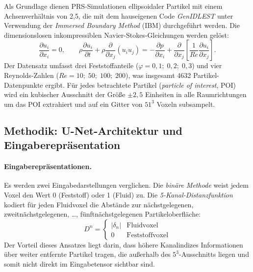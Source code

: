 \documentclass[a4paper,12pt]{article}
\begin{document}
Als Grundlage dienen PRS-Simulationen ellipsoidaler Partikel mit einem
Achsenverhältnis von 2{,}5, die mit dem hauseigenen Code
\textit{GenIDLEST} unter Verwendung der \emph{Immersed Boundary Method} (IBM)
durchgeführt werden. Die dimensionslosen inkompressiblen Navier-Stokes-Gleichungen
werden gelöst:
\begin{equation}
    \frac{\partial u_i}{\partial x_i} = 0, \qquad
    \rho\frac{\partial u_i}{\partial t} + \rho\frac{\partial}{\partial x_j}(u_i u_j)
    = -\frac{\partial p}{\partial x_i}
      + \frac{\partial}{\partial x_j}\!\left[\frac{1}{Re}\frac{\partial u_i}{\partial x_j}\right].
\end{equation}
Der Datensatz umfasst drei Feststoffanteile ($\varphi = 0{,}1;\;0{,}2;\;0{,}3$)
und vier Reynolds-Zahlen ($Re = 10;\;50;\;100;\;200$), was insgesamt
4632 Partikel-Datenpunkte ergibt. Für jedes betrachtete Partikel
(\emph{particle of interest}, POI) wird ein kubischer Ausschnitt der Größe
$\pm2{,}5$ Einheiten in alle Raumrichtungen um das POI extrahiert und auf ein
Gitter von $51^3$ Voxeln subsampelt.

\subsection*{Methodik: U-Net-Architektur und Eingaberepräsentation}

\paragraph{Eingaberepräsentationen.}
Es werden zwei Eingabedarstellungen verglichen. Die \emph{binäre Methode}
weist jedem Voxel den Wert 0 (Feststoff) oder 1 (Fluid) zu. Die
\emph{5-Kanal-Distanzfunktion} kodiert für jeden Fluidvoxel die Abstände zur
nächstgelegenen, zweitnächstgelegenen, \ldots, fünftnächstgelegenen
Partikeloberfläche:
\begin{equation}
    D^n = \begin{cases}
        |\delta_n| & \text{Fluidvoxel} \\
        0          & \text{Feststoffvoxel}
    \end{cases}
\end{equation}
Der Vorteil dieses Ansatzes liegt darin, dass höhere Kanalindizes
Informationen über weiter entfernte Partikel tragen, die außerhalb des
$5^3$-Ausschnitts liegen und somit nicht direkt im Eingabetensor sichtbar sind.
\end{document}
